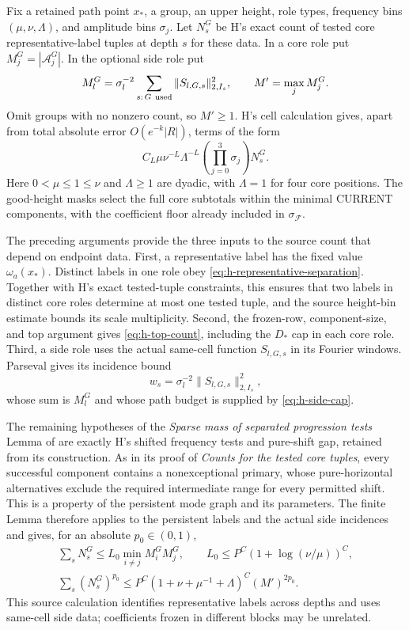 Fix a retained path point \(x_*\), a group, an upper height,
role types, frequency bins \((\mu,\nu,\Lambda)\), and amplitude
bins \(\sigma_j\).  Let \(N_s^G\) be H's exact count of tested
core representative-label tuples at depth \(s\) for these data.
In a core role put \(M_j^G=|\mathcal A_j^G|\).  In the optional
side role put
\[
 M_l^G=\sigma_l^{-2}\sum_{s:\,G\ {\rm used}}
                 \|S_{l,G,s}\|_{2,I_s}^2,\qquad
 M'=\max_jM_j^G.
\]
Omit groups with no nonzero count, so \(M'\ge1\).  H's cell
calculation gives, apart from total absolute error
\(O(e^{-k}|R|)\), terms of the form
\[
 C_L\mu\nu^{-L}\Lambda^{-L}
            \left(\prod_{j=0}^3\sigma_j\right)N_s^G.
\]
Here \(0<\mu\le1\le\nu\) and \(\Lambda\ge1\) are dyadic, with
\(\Lambda=1\) for four core positions.  The good-height masks
select the full core subtotals within the minimal CURRENT
components, with the coefficient floor already included in
\(\sigma_{\mathcal F}\).

The preceding arguments provide the three inputs to the source count
that depend on endpoint data.  First, a
representative label has the fixed value \(\omega_a(x_*)\).
Distinct labels in one role obey
\eqref{eq:h-representative-separation}.  Together with H's exact
tested-tuple constraints, this ensures that two labels in distinct
core roles determine at most one tested tuple, and
the source height-bin estimate bounds its scale multiplicity.
Second, the frozen-row, component-size, and top argument gives
\eqref{eq:h-top-count}, including the \(D_*\) cap in each core
role.  Third, a side role uses the actual same-cell function
\(S_{l,G,s}\) in its Fourier windows.  Parseval gives its
incidence bound
\[
 w_s=\sigma_l^{-2}\|S_{l,G,s}\|_{2,I_s}^2,
\]
whose sum is \(M_l^G\) and whose path budget is supplied by
\eqref{eq:h-side-cap}.

The remaining hypotheses of the
\emph{Sparse mass of separated progression tests} Lemma of
\cite[Section~9]{H} are exactly H's shifted frequency tests
and pure-shift gap, retained from its construction.  As in its proof of
\emph{Counts for the tested core tuples}, every successful
component contains a nonexceptional primary, whose
pure-horizontal alternatives exclude the required intermediate
range for every permitted shift.  This is a property of the
persistent mode graph and its parameters.  The finite Lemma
therefore applies to the persistent labels and the actual
side incidences and gives, for an absolute \(p_0\in(0,1)\),
\begin{equation}
 \begin{gathered}
 \sum_sN_s^G\le L_0\min_{i\ne j}M_i^GM_j^G,\qquad
 L_0\le P^C(1+\log(\nu/\mu))^C,\\
 \sum_s(N_s^G)^{p_0}
 \le P^C(1+\nu+\mu^{-1}+\Lambda)^C(M')^{2p_0}.
 \end{gathered}
 \label{eq:h-core-counts}
\end{equation}
This source calculation identifies representative labels
across depths and uses same-cell side data; coefficients frozen
in different blocks may be unrelated.

